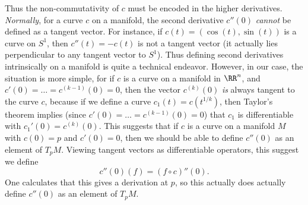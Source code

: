Thus the non-commutativity of $c$ must be encoded in the higher derivatives. \emph{Normally}, for a curve $c$ on a manifold, the second derivative $c''(0)$ \emph{cannot} be defined as a tangent vector. For instance, if $c(t) = (\cos(t), \sin(t))$ is a curve on $S^1$, then $c''(t) = -c(t)$ is not a tangent vector (it actually lies perpendicular to any tangent vector to $S^1$). Thus defining second derivatives intrinsically on a manifold is quite a technical endeavor. However, in our case, the situation is more simple, for if $c$ is a curve on a manifold in $\RR^n$, and $c'(0) = \dots = c^{(k-1)}(0) = 0$, then the vector $c^{(k)}(0)$ \emph{is} always tangent to the curve $c$, because if we define a curve $c_1(t) = c(t^{1/k})$, then Taylor's theorem implies (since $c'(0) = \dots = c^{(k-1)}(0) = 0$) that $c_1$ is differentiable with $c_1'(0) = c^{(k)}(0)$. This suggests that if $c$ is a curve on a manifold $M$ with $c(0) = p$ and $c'(0) = 0$, then we should be able to define $c''(0)$ as an element of $T_pM$. Viewing tangent vectors as differentiable operators, this suggest we define
%
\[ c''(0)(f) = (f \circ c)''(0). \]
%
One calculates that this gives a derivation at $p$, so this actually does actually define $c''(0)$ as an element of $T_p M$.

